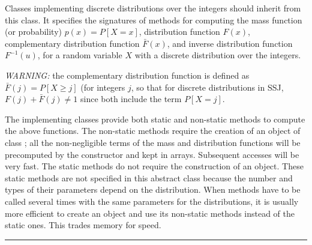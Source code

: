 
Classes implementing discrete distributions over the integers should
inherit from this class.
It specifies the signatures of methods for computing the mass function
(or probability) $p(x) = P[X=x]$, distribution function $F(x)$,
complementary distribution function $\bar F(x)$,
and inverse distribution function $F^{-1}(u)$, for a random variable $X$
with a discrete distribution over the integers.

\emph{WARNING:} the complementary distribution function is defined as
$\bar F(j) = P[X \ge j]$ (for integers $j$, so that for discrete distributions
in SSJ, $F(j) + \bar F(j) \neq 1$ since both include the term $P[X = j]$.

The implementing classes provide both static and non-static methods
to compute the above functions.
The non-static methods require the creation of an object of
class ;
all the non-negligible terms of the mass and distribution functions will be
precomputed by the constructor and kept in arrays. Subsequent accesses
will be very fast.
The static methods do not require the construction of an object.
These static methods are not specified in this abstract class because
the number and types of their parameters depend on the distribution.
When methods have to be called several times
with the same parameters  for the distributions,
it is usually more efficient to create an object and use its non-static
methods instead of the static ones.
This trades memory for speed.

\bigskip\hrule

